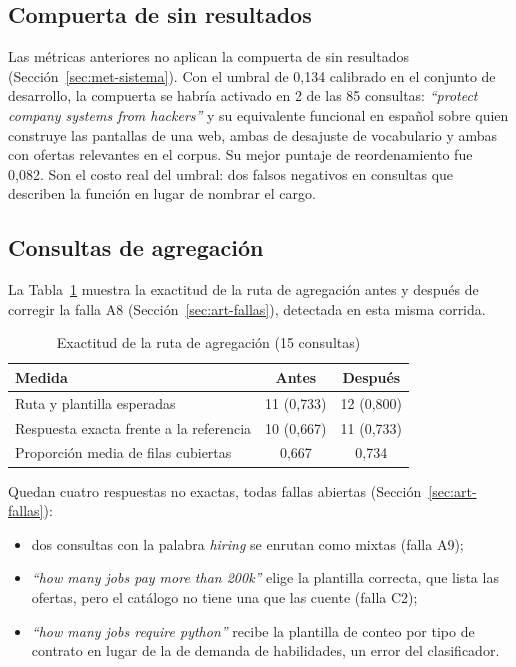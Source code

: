 \subsection{Compuerta de sin resultados}

Las métricas anteriores no aplican la compuerta de sin resultados (Sección~\ref{sec:met-sistema}). Con el umbral de 0,134 calibrado en el conjunto de desarrollo, la compuerta se habría activado en 2 de las 85 consultas: \textit{\enquote{protect company systems from hackers}} y su equivalente funcional en español sobre quien construye las pantallas de una web, ambas de desajuste de vocabulario y ambas con ofertas relevantes en el corpus. Su mejor puntaje de reordenamiento fue 0,082. Son el costo real del umbral: dos falsos negativos en consultas que describen la función en lugar de nombrar el cargo.

\subsection{Consultas de agregación}
\label{sec:res-agregacion}

La Tabla~\ref{tab:res-agregacion} muestra la exactitud de la ruta de agregación antes y después de corregir la falla A8 (Sección~\ref{sec:art-fallas}), detectada en esta misma corrida.

\begin{table}[htbp!]
    \centering
    \caption{Exactitud de la ruta de agregación (15 consultas)}
    \label{tab:res-agregacion}
    \begin{tabular}{|l|c|c|}
        \hline
        \textbf{Medida} & \textbf{Antes} & \textbf{Después} \\
        \hline
        Ruta y plantilla esperadas & 11 (0{,}733) & 12 (0{,}800) \\
        \hline
        Respuesta exacta frente a la referencia & 10 (0{,}667) & 11 (0{,}733) \\
        \hline
        Proporción media de filas cubiertas & 0{,}667 & 0{,}734 \\
        \hline
    \end{tabular}
\end{table}

Quedan cuatro respuestas no exactas, todas fallas abiertas (Sección~\ref{sec:art-fallas}):
\begin{itemize}
    \item dos consultas con la palabra \textit{hiring} se enrutan como mixtas (falla A9);
    \item \textit{\enquote{how many jobs pay more than 200k}} elige la plantilla correcta, que lista las ofertas, pero el catálogo no tiene una que las cuente (falla C2);
    \item \textit{\enquote{how many jobs require python}} recibe la plantilla de conteo por tipo de contrato en lugar de la de demanda de habilidades, un error del clasificador.
\end{itemize}

